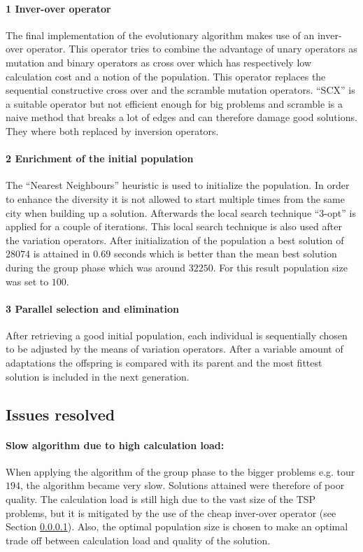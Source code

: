 \documentclass[a4paper,10pt]{article}
\begin{document}
\paragraph{1 Inver-over operator}\label{p:1}The final implementation of the evolutionary algorithm makes use of an inver-over operator. This operator tries to combine the advantage of unary operators as mutation and binary operators as cross over which has respectively low calculation cost and a notion of the population. This operator replaces the sequential constructive cross over and the scramble mutation operators. ``SCX'' is a suitable operator but not efficient enough for big problems and scramble is a naive method that breaks a lot of edges and can therefore damage good solutions.  They where both replaced by inversion operators.

\paragraph{2 Enrichment of the initial population}\label{p:2} The ``Nearest Neighbours'' heuristic is used to initialize the population. In order to enhance the diversity it is not allowed to start multiple times from the same city when building up a solution. Afterwards the local search technique ``3-opt'' is applied for a couple of iterations. This local search technique is also used after the variation operators. After initialization of the population a best solution of $28074$ is attained in $0.69$ seconds which is better than the mean best solution during the group phase which was around $32250$. For this result population size was set to $100$.

\paragraph{3 Parallel selection and elimination}\label{p:3} After retrieving a good initial population, each individual is sequentially chosen to be adjusted by the means of variation operators. After a variable amount of adaptations the offspring is compared with its parent and the most fittest solution is included in the next generation. 

\subsection{Issues resolved}

\paragraph{Slow algorithm due to high calculation load:} When applying the algorithm of the group phase to the bigger problems e.g. tour $194$, the algorithm became very slow. Solutions attained were therefore of poor quality. The calculation load is still high due to the vast size of the TSP problems, but it is mitigated by the use of the cheap inver-over operator (see Section \ref{p:1}).  Also, the optimal population size is chosen to make an optimal trade off between  calculation load and quality of the solution.
\end{document}
